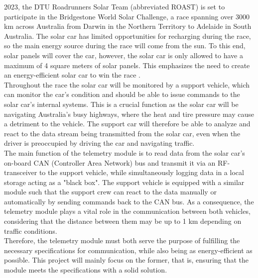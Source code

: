 \documentclass[conference]{IEEEtran}
\begin{document}
 2023, the DTU Roadrunners Solar Team (abbreviated ROAST) is set to participate in the Bridgestone World Solar Challenge, a race spanning over 3000 km across Australia from Darwin in the Northern Territory to Adelaide in South Australia. The solar car has limited opportunities for recharging during the race, so the main energy source during the race will come from the sun. To this end, solar panels will cover the car, however, the solar car is only allowed to have a maximum of 4 square meters of solar panels. This emphasizes the need to create an energy-efficient solar car to win the race \cite{wsc}.\\
Throughout the race the solar car will be monitored by a support vehicle, which can monitor the car's condition and should be able to issue commands to the solar car's internal systems. This is a crucial function as the solar car will be navigating Australia's busy highways, where the heat and tire pressure may cause a detriment to the vehicle. The support car will therefore be able to analyze and react to the data stream being transmitted from the solar car, even when the driver is preoccupied by driving the car and navigating traffic. \\
The main function of the telemetry module is to read data from the solar car's on-board CAN (Controller Area Network) bus and transmit it via an RF-transceiver to the support vehicle, while simultaneously logging data in a local storage acting as a "black box". The support vehicle is equipped with a similar module such that the support crew can react to the data manually or automatically by sending commands back to the CAN bus. As a consequence, the telemetry module plays a vital role in the communication between both vehicles, considering that the distance between them may be up to 1 km depending on traffic conditions.\\
Therefore, the telemetry module must both serve the purpose of fulfilling the necessary specifications for communication, while also being as energy-efficient as possible. This project will mainly focus on the former, that is, ensuring that the module meets the specifications with a solid solution.
\end{document}
